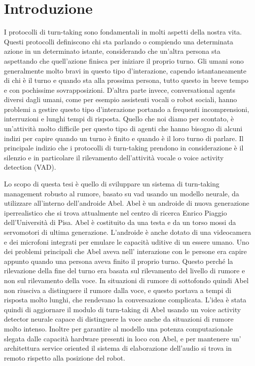 \documentclass[12pt]{article}
\begin{document}
\section{Introduzione}

I protocolli di turn-taking sono fondamentali in molti aspetti della nostra vita. Questi protocolli definiscono chi sta parlando o compiendo una determinata azione in un determinato istante, considerando che un'altra persona sta aspettando che quell'azione finisca per iniziare il proprio turno. Gli umani sono generalmente molto bravi in questo tipo d'interazione, capendo istantaneamente di chi è il turno e quando sta alla prossima persona, tutto questo in breve tempo e con pochissime sovrapposizioni. D'altra parte invece, conversational agents diversi dagli umani, come per esempio assistenti vocali o robot sociali, hanno problemi a gestire questo tipo d'interazione portando a frequenti incomprensioni, interruzioni e lunghi tempi di risposta. Quello che noi diamo per scontato, è un'attività molto difficile per questo tipo di agenti che hanno bisogno di alcuni indizi per capire quando un turno è finito e quando è il loro turno di parlare. Il principale indizio che i protocolli di turn-taking prendono in considerazione è il silenzio e in particolare il rilevamento dell'attività vocale o voice activity detection (VAD).

Lo scopo di questa tesi è quello di sviluppare un sistema di turn-taking management robusto al rumore, basato su vad usando un modello neurale, da utilizzare all'interno dell'androide Abel. 
Abel è un androide di nuova generazione iperrealistico che si trova attualmente nel centro di ricerca Enrico Piaggio dell'Università di Pisa. Abel è costituito da una testa e da un torso mossi da servomotori di ultima generazione. L'androide è anche dotato di una videocamera e dei microfoni integrati per emulare le capacità uditive di un essere umano. 
Uno dei problemi principali che Abel aveva nell' interazione con le persone era capire appunto quando una persona aveva finito il proprio turno. Questo perché la rilevazione della fine del turno era basata sul rilevamento del livello di rumore e non sul rilevamento della voce. In situazioni di rumore di sottofondo quindi Abel non riusciva a distinguere il rumore dalla voce, e questo portava a tempi di risposta molto lunghi, che rendevano la conversazione complicata.
L'idea è stata quindi di aggiornare il modulo di turn-taking di Abel usando un voice activity detector neurale capace di distinguere la voce anche da situazioni di rumore molto intenso. Inoltre per garantire al modello una potenza computazionale slegata dalle capacità hardware presenti in loco con Abel, e per mantenere un' architettura service oriented il sistema di elaborazione dell'audio si trova in remoto rispetto alla posizione del robot. 
\end{document}
